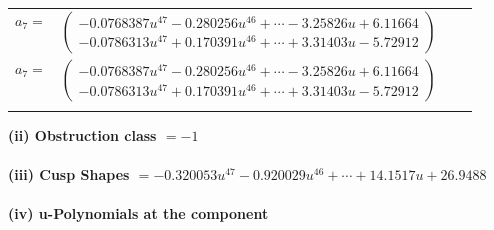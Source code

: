 \documentclass[1p]{elsarticle_modified}
\theoremstyle{definition}
\begin{document}
\begin{tabular}{m{7pt} m{180pt} m{7pt} m{180pt} }
\flushright $a_{7}=$&$\begin{pmatrix}-0.0768387 u^{47}-0.280256 u^{46}+\cdots-3.25826 u+6.11664\\-0.0786313 u^{47}+0.170391 u^{46}+\cdots+3.31403 u-5.72912\end{pmatrix}$\\ \flushright $a_{7}=$&$\begin{pmatrix}-0.0768387 u^{47}-0.280256 u^{46}+\cdots-3.25826 u+6.11664\\-0.0786313 u^{47}+0.170391 u^{46}+\cdots+3.31403 u-5.72912\end{pmatrix}$\\&\end{tabular}
\flushleft \textbf{(ii) Obstruction class $= -1$}\\~\\
\flushleft \textbf{(iii) Cusp Shapes $= -0.320053 u^{47}-0.920029 u^{46}+\cdots+14.1517 u+26.9488$}\\~\\
\newpage\renewcommand{\arraystretch}{1}
\flushleft \textbf{(iv) u-Polynomials at the component}\newline \\
\end{document}
